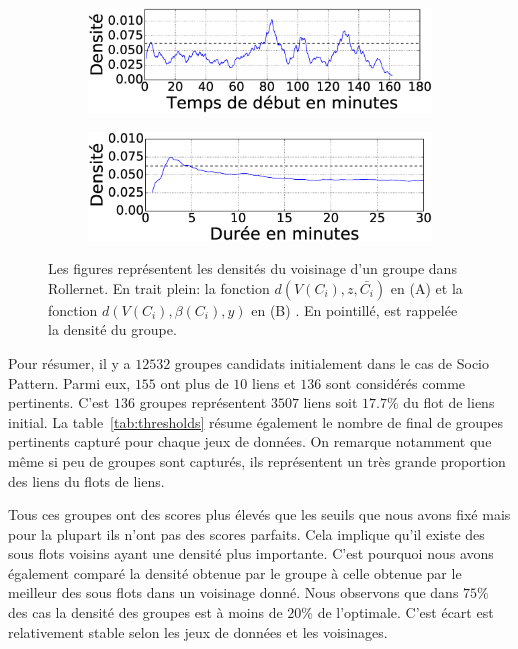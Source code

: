 \begin{figure}
\centering
\begin{subfigure}{0.45\linewidth}
	\includegraphics[width=\linewidth]{img/GroupeDense/GroupExample/Rollernet/vairable_start7}
	\caption{}
	\label{fig:g7_debut}
\end{subfigure}
\begin{subfigure}{0.45\linewidth}
	\includegraphics[width=\linewidth]{img/GroupeDense/GroupExample/Rollernet/vairable_duration7}
	\caption{}
	\label{fig:g7_duree}
\end{subfigure}
\caption{
Les figures représentent les densités du voisinage d'un groupe dans Rollernet.
En trait plein: la fonction $d(V(C_i),z,\bar{C_i})$ en (A) et la fonction  $d(V(C_i),\beta(C_i),y)$ en (B) .
En pointillé, est rappelée la densité du groupe.
}
\label{fig:Rollernet_exemple}
\end{figure}





\bigskip
Pour résumer, il y a $12 532$  groupes candidats initialement dans le cas de Socio Pattern.
Parmi eux, $155$ ont plus de $10$ liens et $136$ sont considérés comme pertinents.
C'est $136$ groupes représentent $3507$ liens soit $17.7\%$ du flot de liens initial.
La table~\ref{tab:thresholds} résume également le nombre de final de groupes pertinents capturé pour chaque jeux de données.
On remarque notamment que même si peu de groupes sont capturés, ils représentent un très grande proportion des liens du flots de liens.

Tous ces groupes ont des scores plus élevés que les seuils que nous avons fixé mais pour la plupart ils n'ont pas des scores parfaits.
Cela implique qu'il existe des sous flots voisins ayant une densité plus importante.
C'est pourquoi nous avons également comparé la densité obtenue par le groupe à celle obtenue par le meilleur des sous flots dans un voisinage donné.
Nous observons que dans $75\%$ des cas la densité des groupes est à moins de $20\%$ de l'optimale.
C'est écart est relativement stable selon les jeux de données et les voisinages.

